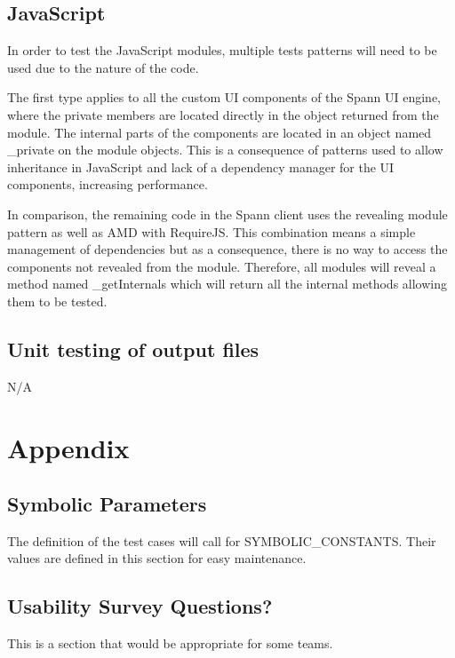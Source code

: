 \documentclass[12pt, titlepage]{article}
\begin{document}
\subsection{JavaScript} In order to test the JavaScript modules, multiple tests
patterns will need to be used due to the nature of the code. 

The first type applies to all the custom UI components of the Spann UI engine,
where the private members are located directly in the object returned from the
module. The internal parts of the components are located in an object named
\_private on the module objects. This is a consequence of patterns used to allow
inheritance in JavaScript and lack of a dependency manager for the UI
components, increasing performance.  

In comparison, the remaining code in the Spann client uses the revealing module
pattern as well as AMD with RequireJS. This combination means a simple
management of dependencies but as a consequence, there is no way to access the
components not revealed from the module. Therefore, all modules will reveal a
method named \_getInternals which will return all the internal methods allowing
them to be tested. 

		
\subsection{Unit testing of output files}		
N/A






\newpage

\section{Appendix}

\subsection{Symbolic Parameters}

The definition of the test cases will call for SYMBOLIC\_CONSTANTS.
Their values are defined in this section for easy maintenance.

\subsection{Usability Survey Questions?}

This is a section that would be appropriate for some teams.
\end{document}
